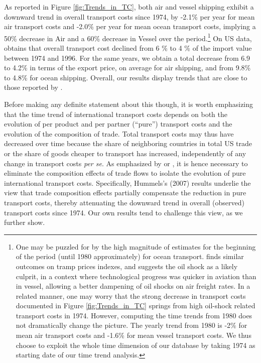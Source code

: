 \documentclass[a4paper,11pt]{article}
\begin{document}
As reported in Figure \ref{fig:Trends_in_TC}, both air and vessel shipping exhibit a downward trend in overall transport costs since 1974, by -2.1\% per year for mean air transport costs and -2.0\% per year for mean ocean transport costs, implying a 50\% decrease in Air and a 60\% decrease in Vessel over the period.\footnote{One may be puzzled for by the high magnitude of estimates for the beginning of the period (until 1980 approximately) for ocean transport.
\citet{hummels2007} finds similar outcomes on tramp prices indexes, and suggests the oil shock as a likely culprit, in a context where technological progress was quicker in aviation than in vessel, allowing a better dampening of oil shocks on air freight rates.
In a related manner, one may worry that the strong decrease in transport costs documented in Figure \ref{fig:Trends_in_TC} springs from high oil-shock related transport costs in 1974.
However, computing the time trends from 1980 does not dramatically change the picture.
The yearly trend from 1980 is -2\% for mean air transport costs and -1.6\% for mean vessel transport costs.
We thus choose to exploit the whole time dimension of our database by taking 1974 as starting date of our time trend analysis.} On US data, \citet{Hummels_1999} obtains that overall transport cost declined from 6 \% to 4 \% of the import value between 1974 and 1996.
For the same years, we obtain a total decrease from 6.9 to 4.2\% in terms of the export price, on average for air shipping, and from 9.8\% to 4.8\% for ocean shipping.
Overall, our results display trends that are close to those reported by \citet{Hummels_1999}.\smallskip


Before making any definite statement about this though, it is worth emphasizing that the time trend of international transport costs depends on both the evolution of per product and per partner (``pure'') transport costs and the evolution of the composition of trade.
Total transport costs may thus have decreased over time because the share of neighboring countries in total US trade or the share of goods cheaper to transport has increased, independently of any change in transport costs \textit{per se}.
As emphasized by \citet{Hummels_1999} or \cite{hummels2007}, it is hence necessary to eliminate the composition effects of trade flows to isolate the evolution of pure international transport costs.
Specifically, Hummels's (2007) results\nocite{hummels2007} underlie the view that trade composition effects partially compensate the reduction in pure transport costs, thereby attenuating the downward trend in overall (observed) transport costs since 1974.
Our own results tend to challenge this view, as we further show.
\end{document}
